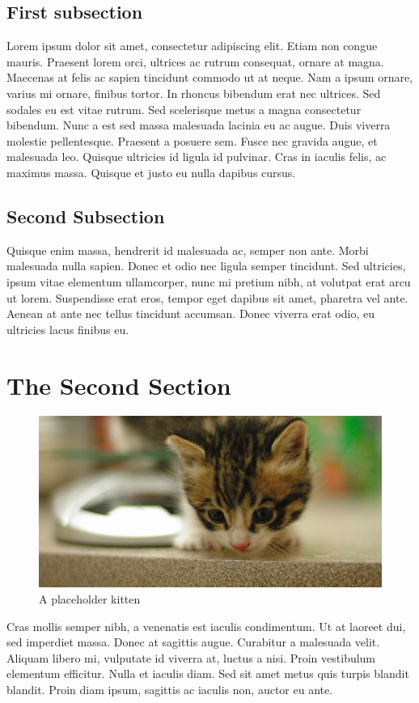 \documentclass[12pt,letterpaper]{article}
\begin{document}
\subsection{First subsection}
Lorem ipsum dolor sit amet, consectetur adipiscing elit. Etiam non congue mauris. Praesent lorem orci, ultrices ac rutrum consequat, ornare at magna. Maecenas at felis ac sapien tincidunt commodo ut at neque. Nam a ipsum ornare, varius mi ornare, finibus tortor. In rhoncus bibendum erat nec ultrices. Sed sodales eu est vitae rutrum. Sed scelerisque metus a magna consectetur bibendum. Nunc a est sed massa malesuada lacinia eu ac augue. Duis viverra molestie pellentesque. Praesent a posuere sem. Fusce nec gravida augue, et malesuada leo. Quisque ultricies id ligula id pulvinar. Cras in iaculis felis, ac maximus massa. Quisque et justo eu nulla dapibus cursus.

\subsection{Second Subsection}
Quisque enim massa, hendrerit id malesuada ac, semper non ante. Morbi malesuada nulla sapien. Donec et odio nec ligula semper tincidunt. Sed ultricies, ipsum vitae elementum ullamcorper, nunc mi pretium nibh, at volutpat erat arcu ut lorem. Suspendisse erat eros, tempor eget dapibus sit amet, pharetra vel ante. Aenean at ante nec tellus tincidunt accumsan. Donec viverra erat odio, eu ultricies lacus finibus eu.

\section{The Second Section}
\begin{figure}[H]
	\centering	
	\includegraphics[width=\linewidth]{img/placekitten_600x300.jpg}
	\caption{A placeholder kitten}
	\label{fig:kitten}
\end{figure}
Cras mollis semper nibh, a venenatis est iaculis condimentum. Ut at laoreet dui, sed imperdiet massa. Donec at sagittis augue. Curabitur a malesuada velit. Aliquam libero mi, vulputate id viverra at, luctus a nisi. Proin vestibulum elementum efficitur. Nulla et iaculis diam. Sed sit amet metus quis turpis blandit blandit. Proin diam ipsum, sagittis ac iaculis non, auctor eu ante.
\end{document}
